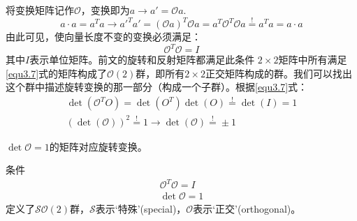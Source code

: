将变换矩阵记作$\mathcal{O}$，变换即为$a \rightarrow a' = \mathcal{O}a$.
\begin{equation}
\label{equ3.6}
a \cdot a = a^{{T}} a \rightarrow a'^{{T}} a' = (\mathcal{O} a)^{{T}} \mathcal{O} a = a^{{T}} \mathcal{O}^{{T}} \mathcal{O} a \stackrel{!}{=} a^{{T}} a = a \cdot a
\end{equation}
由此可见，使向量长度不变的变换必须满足：
\begin{equation}
\label{equ3.7}
\mathcal{O}^{{T}} \mathcal{O} = I
\end{equation}
其中$I$表示单位矩阵\mpar{ \[I =
	\begin{pmatrix}
		1 & 0 \\ 0 & 1
	\end{pmatrix}\]}。前文的旋转和反射矩阵都满足此条件%
$2 \times 2$矩阵中所有满足\ref{equ3.7}式的矩阵构成了$\mathcal{O}(2)$群，即所有$2 \times 2$正交矩阵构成的群。我们可以找出这个群中描述旋转变换的那一部分（构成一个子群）。根据\ref{equ3.7}式：
\begin{align}
\det(\mathcal{O}^{{T}} O ) = \det(O^{{T}}) \det(O) \stackrel{!}{=} \det(I) = 1 \nonumber\\
\label{equ3.8}
(\det(\mathcal{O}))^2 \stackrel{!}{=} 1 \rightarrow \det{(\mathcal{O})} \stackrel{!}{=} \pm 1
\end{align}

$\det \mathcal{O} = 1$的矩阵对应旋转变换。

条件
\begin{align}
\label{equ3.9}
\mathcal{O}^{{T}} \mathcal{O} = I \\
\label{equ3.10}
\det \mathcal{O} = 1
\end{align}
定义了$\mathcal{SO}(2)$群，$\mathcal{S}$表示‘特殊’(special)，$\mathcal{O}$表示‘正交’(orthogonal)。

